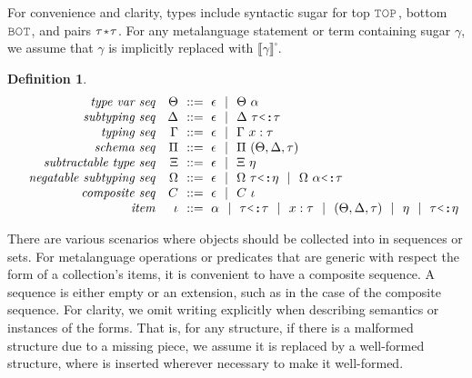 \documentclass[table,dvipsnames,acmsmall]{acmart}
\theoremstyle{definition}
\newtheorem{definition}{Definition}[section]
\begin{document}
\noindent
For convenience and clarity, types include syntactic sugar for top $\J{TOP}$, 
bottom $\J{BOT}$, and pairs $\tau \J{*} \tau$.
For any metalanguage statement or term containing sugar $\gamma$, we assume that $\gamma$ is implicitly replaced with $\llbracket \gamma \rrbracket^\square$.

\begin{definition}
  \label{def:sequence}
  \small
  \nopad
  \[\begin{array}[t]{rr@{}l}
    \com{type var seq} &
    \nonterm{\Theta} & \is \epsilon \sep \Theta\ \alpha 
    \\
    \com{subtyping seq} &
    \nonterm{\Delta} & \is \epsilon \sep \Delta \  \tau \J{<:} \tau
    \\
    \com{typing seq} &
    \nonterm{\Gamma} & \is \epsilon \sep \Gamma\ x \hastype \tau
    \\
    \com{schema seq} &
    \nonterm{\Pi} & \is \epsilon \sep \Pi\ (\Theta, \Delta, \tau) 
    \\
    \com{subtractable type seq} &
    \nonterm{\Xi} & \is \epsilon \sep \Xi\ \eta 
    \\
    \com{negatable subtyping seq} &
    \nonterm{\Omega} & \is \epsilon \sep 
      \Omega\ \tau \J{<:} \eta \sep 
      \Omega\ \alpha \J{<:} \tau
    \\
    \com{composite seq} &
    \nonterm{C} & \is \epsilon \sep C\ \iota 
    \\
    \com{item} &
    \nonterm{\iota} & \is 
    \alpha
    \sep 
    \tau \J{<:} \tau
    \sep
    x \hastype \tau
    \sep
    (\Theta, \Delta, \tau)
    \sep
    \eta
    \sep
    \tau \J{<:} \eta

  \end{array}\]
\end{definition}


\noindent
There are various scenarios where objects should be collected into in sequences or sets.
For metalanguage operations or predicates that are generic with respect the form of a collection's items,
it is convenient to have a composite sequence.
A sequence is either empty \ms{\epsilon} or an extension,
such as  in the case of the composite sequence. 
For clarity, we omit writing \ms{\epsilon} explicitly when describing semantics or instances of the forms.
That is, for any structure, if there is a malformed structure due to a missing piece, 
we assume it is replaced by a well-formed structure, 
where \ms{\epsilon} is inserted wherever necessary to make it well-formed.
\end{document}
